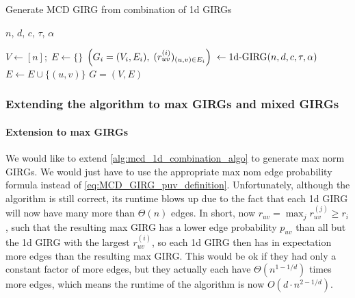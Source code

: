 \begin{algorithm}
\begin{algorithmic}
    \caption{Generate MCD GIRG from combination of 1d GIRGs}
    \label{alg:mcd_1d_combination_algo}
    \Require $n$, $d$, $c$, $\tau$, $\alpha$

    \State $V \gets [n];\; E \gets \{\}$
        \State $\left ( G_i = (V_i, E_i),\; (r_{uv}^{(i)})_{(u,v) \in E_i} \right ) \; \gets \text{1d-}\mathrm{GIRG}(n,d,c,\tau, \alpha)$
    \EndFor
                \State $E \gets E \cup \{(u, v)\}$
            \EndIf
        \EndFor
    \EndFor
    \State \Return $G=(V,E)$
\end{algorithmic}
\end{algorithm}

\subsubsection{Extending the algorithm to max GIRGs and mixed GIRGs}
\paragraph{Extension to max GIRGs} We would like to extend \cref{alg:mcd_1d_combination_algo} to generate max norm GIRGs. We would just have to use the appropriate max nom edge probability formula instead of \cref{eq:MCD_GIRG_puv_definition}. Unfortunately, although the algorithm is still correct, its runtime blows up due to the fact that each 1d GIRG will now have many more than $\Theta(n)$ edges.
In short, now $r_{uv} = \max_j r^{(j)}_{uv} \geq r_i$, such that the resulting max GIRG has a lower edge probability $p_{uv}$ than all but the 1d GIRG with the largest $r^{(i)}_{uv}$, so each 1d GIRG then has in expectation more edges than the resulting max GIRG.
This would be ok if they had only a constant factor of more edges, but they actually each have $\Theta(n^{1 - 1/d})$ times more edges, which means the runtime of the algorithm is now $O(d \cdot n^{2 - 1/d})$.

